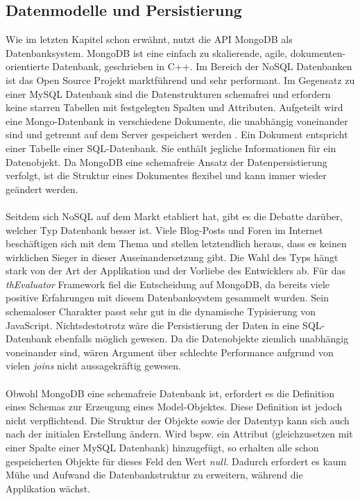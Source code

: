 \subsection{Datenmodelle und Persistierung}
\label{mongo}

Wie im letzten Kapitel schon erwähnt, nutzt die API MongoDB als Datenbanksystem. MongoDB ist eine einfach zu skalierende, agile, dokumenten-orientierte Datenbank, geschrieben in C++. Im Bereich der NoSQL Datenbanken ist das Open Source Projekt marktführend und sehr performant. Im Gegensatz zu einer MySQL Datenbank sind die Datenstrukturen schemafrei und erfordern keine starren Tabellen mit festgelegten Spalten und Attributen. Aufgeteilt wird eine Mongo-Datenbank in verschiedene Dokumente, die unabhängig voneinander sind und getrennt auf dem Server gespeichert werden \cite{nosql}. Ein Dokument entspricht einer Tabelle einer SQL-Datenbank. Sie enthält jegliche Informationen für ein Datenobjekt. Da MongoDB eine schemafreie Ansatz der Datenpersistierung verfolgt, ist die Struktur eines Dokumentes flexibel und kann immer wieder geändert werden.\\
\\
Seitdem sich NoSQL auf dem Markt etabliert hat, gibt es die Debatte darüber, welcher Typ Datenbank besser ist. Viele Blog-Posts und Foren im Internet beschäftigen sich mit dem Thema und stellen letztendlich heraus, dass es keinen wirklichen Sieger in dieser Auseinandersetzung gibt. Die Wahl des Typs hängt stark von der Art der Applikation und der Vorliebe des Entwicklers ab. Für das \textit{thEvaluator} Framework fiel die Entscheidung auf MongoDB, da bereits viele positive Erfahrungen mit diesem Datenbanksystem gesammelt wurden. Sein schemaloser Charakter passt sehr gut in die dynamische Typisierung von JavaScript. Nichtsdestotrotz wäre die Persistierung der Daten in eine SQL-Datenbank ebenfalls möglich gewesen. Da die Datenobjekte ziemlich unabhängig voneinander sind, wären Argument über schlechte Performance aufgrund von vielen \textit{\Gls{joins}} nicht aussagekräftig gewesen.\\
\\
Obwohl MongoDB eine schemafreie Datenbank ist, erfordert es die Definition eines Schemas zur Erzeugung eines Model-Objektes. Diese Definition ist jedoch nicht verpflichtend. Die Struktur der Objekte sowie der Datentyp kann sich auch nach der initialen Erstellung ändern. Wird bspw. ein Attribut (gleichzusetzen mit einer Spalte einer MySQL Datenbank) hinzugefügt, so erhalten alle schon gespeicherten Objekte für dieses Feld den Wert \textit{null}. Dadurch erfordert es kaum Mühe und Aufwand die Datenbankstruktur zu erweitern, während die Applikation wächst.\\
